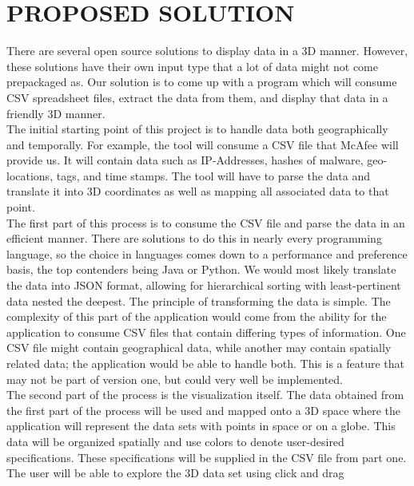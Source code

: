 \documentclass[letterpaper,10pt,titlepage, onecolumn]{IEEEtran}
\begin{document}
\section {PROPOSED SOLUTION}
There are several open source solutions to display data in a 3D manner. However, these solutions have their own input type that a lot of data might not come prepackaged as. Our solution is to come up with a program which will consume CSV spreadsheet files, extract the data from them, and display that data in a friendly 3D manner. \\ 
The initial starting point of this project is to handle data both geographically and temporally. For example, the tool will consume a CSV file that McAfee will provide us. It will contain data such as IP-Addresses, hashes of malware, geo-locations, tags, and time stamps. The tool will have to parse the data and translate it into 3D coordinates as well as mapping all associated data to that point. \\
The first part of this process is to consume the CSV file and parse the data in an efficient manner. There are solutions to do this in nearly every programming language, so the choice in languages comes down to a performance and preference basis, the top contenders being Java or Python. We would most likely translate the data into JSON format, allowing for hierarchical sorting with least-pertinent data nested the deepest. The principle of transforming the data is simple. The complexity of this part of the application would come from the ability for the application to consume CSV files that contain differing types of information. One CSV file might contain geographical data, while another may contain spatially related data; the application would be able to handle both. This is a feature that may not be part of version one, but could very well be implemented. \\
The second part of the process is the visualization itself. The data obtained from the first part of the process will be used and mapped onto a 3D space where the application will represent the data sets with points in space or on a globe. This data will be organized spatially and use colors to denote user-desired specifications. These specifications will be supplied in the CSV file from part one. The user will be able to explore the 3D data set using click and drag
\end{document}
